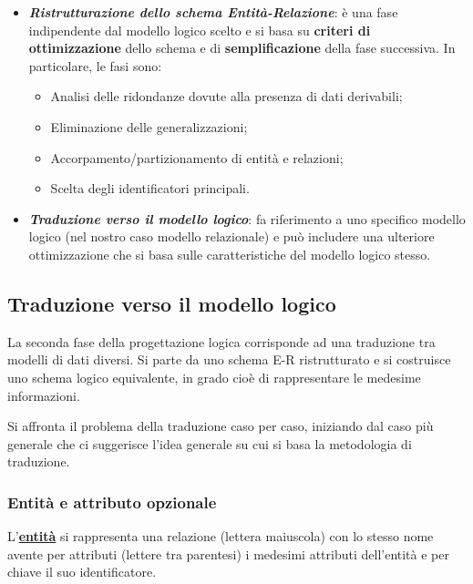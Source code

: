 \documentclass[a4paper]{article}
\begin{document}
	\begin{itemize}
		\item \textcolor{Red3}{\textbf{\emph{Ristrutturazione dello schema Entità-Relazione}}}: è una fase indipendente dal modello logico scelto e si basa su \textbf{criteri di ottimizzazione} dello schema e di \textbf{semplificazione} della fase successiva. In particolare, le fasi sono:
		\begin{itemize}
			\item Analisi delle ridondanze dovute alla presenza di dati derivabili;
			\item Eliminazione delle generalizzazioni;
			\item Accorpamento/partizionamento di entità e relazioni;
			\item Scelta degli identificatori principali.
		\end{itemize}
	
		\item \textcolor{Red3}{\textbf{\emph{Traduzione verso il modello logico}}}: fa riferimento a uno specifico modello logico (nel nostro caso modello relazionale) e può includere una ulteriore ottimizzazione che si basa sulle caratteristiche del modello logico stesso.
	\end{itemize}
	
	\newpage
	
	\subsection{Traduzione verso il modello logico}
	
	La seconda fase della progettazione logica corrisponde ad una traduzione tra modelli di dati diversi. Si parte da uno schema E-R ristrutturato e si costruisce uno schema logico equivalente, in grado cioè di rappresentare le medesime informazioni.
	
	Si affronta il problema della traduzione caso per caso, iniziando dal caso più generale che ci suggerisce l'idea generale su cui si basa la metodologia di traduzione.
	
	\subsubsection{Entità e attributo opzionale}
	
	L'\textcolor{Red3}{\textbf{\underline{entità}}} si rappresenta una relazione (lettera maiuscola) con lo stesso nome avente per attributi (lettere tra parentesi) i medesimi attributi dell'entità e per chiave il suo identificatore.
	
\end{document}
